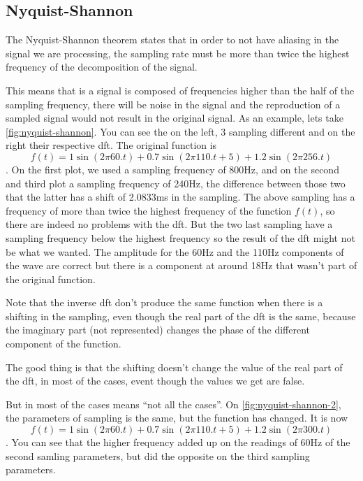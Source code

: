 \subsection{Nyquist-Shannon}\label{section:nyquist}
The Nyquist-Shannon theorem states that in order to not have aliasing in the signal we are processing, the sampling rate must be more than twice the highest frequency of the decomposition of the signal.

This means that is a signal is composed of frequencies higher than the half of the sampling frequency, there will be noise in the signal and the reproduction of a sampled signal would not result in the original signal. As an example, lets take \autoref{fig:nyquist-shannon}. You can see the on the left, 3 sampling different and on the right their respective \acrlong{dft}. The original function is $$f(t) = 1\sin(2\pi60.t) + 0.7\sin(2\pi110.t+5) + 1.2\sin(2\pi256.t)$$. On the first plot, we used a sampling frequency of 800Hz, and on the second and third plot a sampling frequency of 240Hz, the difference between those two that the latter has a shift of 2.0833ms in the sampling. The above sampling has a frequency of more than twice the highest frequency of the function $f(t)$, so there are indeed no problems with the \acrshort{dft}. But the two last sampling have a sampling frequency below the highest frequency so the result of the \acrshort{dft} might not be what we wanted. The amplitude for the 60Hz and the 110Hz components of the wave are correct but there is a component at around 18Hz that wasn't part of the original function.

Note that the inverse \acrshort{dft} don't produce the same function when there is a shifting in the sampling, even though the real part of the \acrshort{dft} is the same, because the imaginary part (not represented) changes the phase of the different component of the function.

The good thing is that the shifting doesn't change the value of the real part of the \acrshort{dft}, in most of the cases, event though the values we get are false.

But in most of the cases means “not all the cases”. On \autoref{fig:nyquist-shannon-2}, the parameters of sampling is the same, but the function has changed. It is now $$f(t) = 1\sin(2\pi60.t) + 0.7\sin(2\pi110.t+5) + 1.2\sin(2\pi300.t)$$. You can see that the higher frequency added up on the readings of 60Hz of the second samling parameters, but did the opposite on the third sampling parameters.



